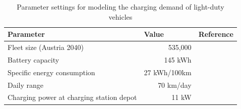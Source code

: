 \documentclass[final,10pt]{elsarticle}
\begin{document}
        \begin{table}[]
        \centering
        \caption{Parameter settings for modeling the charging demand of light-duty vehicles}
        \label{tab:parameters_ldv}
        \begin{tabular}{@{}lrl@{}}
        \toprule
        \textbf{Parameter}                       & \multicolumn{1}{l}{\textbf{Value}} & \textbf{Reference} \\ \midrule
        Fleet size (Austria 2040)                & 535,000                            &   \cite{umweltbundesamt_rep0808}                 \\
        Battery capacity                         & 145 kWh                            &      \cite{irena2019smart_charging}              \\
        Specific energy consumption              & 27 kWh/100km                       &     \cite{umweltbundesamt_rep0808}              \\
        Daily range                              & 70 km/day                          &  \cite{SCORRANO2021101022}                   \\
        Charging power at charging station depot & 11 kW                              &        \cite{SCORRANO2021101022}             \\ \bottomrule
        \end{tabular}%
        
        \end{table}


\end{document}

